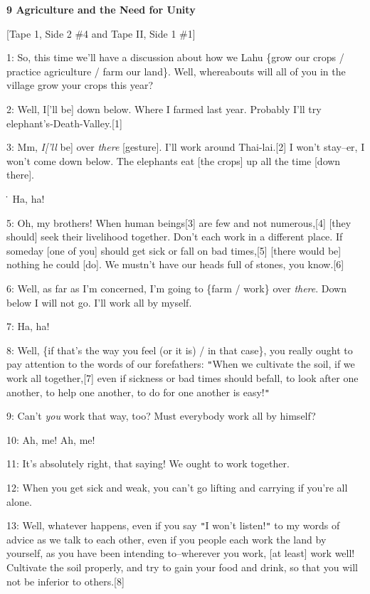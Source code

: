 
\textbf{9 Agriculture and the Need for Unity}

[Tape 1,  Side 2 \#4 and Tape II, Side 1 \#1]

1: So, this time we'll have a discussion about how we Lahu \{grow our crops / practice
agriculture / farm our land\}. Well, whereabouts will all of you in the village
grow your crops this year?

2: Well, I['ll be] down below. Where I farmed last year. Probably I'll try elephant's-Death-Valley.[1]

3: Mm, \textit{I['ll} be] over \textit{there} [gesture]. I'll work around Thai-lai.[2]
I won't stay--er, I won't come down below. The elephants eat [the crops] up all
the time [down there].

\. Ha, ha!

5: Oh, my brothers! When human beings[3] are few and not numerous,[4] [they should]
seek their livelihood together. Don't each work in a different place. If someday
[one of you] should get sick or fall on bad times,[5] [there would be] nothing
he could [do]. We mustn't have our heads full of stones, you know.[6]

6: Well, as far as I'm concerned, I'm going to \{farm / work\} over \textit{there}.
Down below I will not go. I'll work all by myself.

7: Ha, ha!

8: Well, \{if that's the way you feel (or it is) / in that case\}, you really ought
to pay attention to the words of our forefathers: \texttt{"}When we cultivate the
soil, if we work all together,[7] even if sickness or bad times should befall,
to look after one another, to help one another, to do for one another is easy!\texttt{"}


9: Can't \textit{you} work that way, too? Must everybody work all by himself?

10: Ah, me! Ah, me!

11: It's absolutely right, that saying! We ought to work together.

12: When you get sick and weak, you can't go lifting and carrying if you're all
alone.

13: Well, whatever happens, even if you say \texttt{"}I won't listen!\texttt{"}
to my words of advice as we talk to each other, even if you people each work the
land by yourself, as you have been intending to--wherever you work, [at least]
work well! Cultivate the soil properly, and try to gain your food and drink, so
that you will not be inferior to others.[8]

